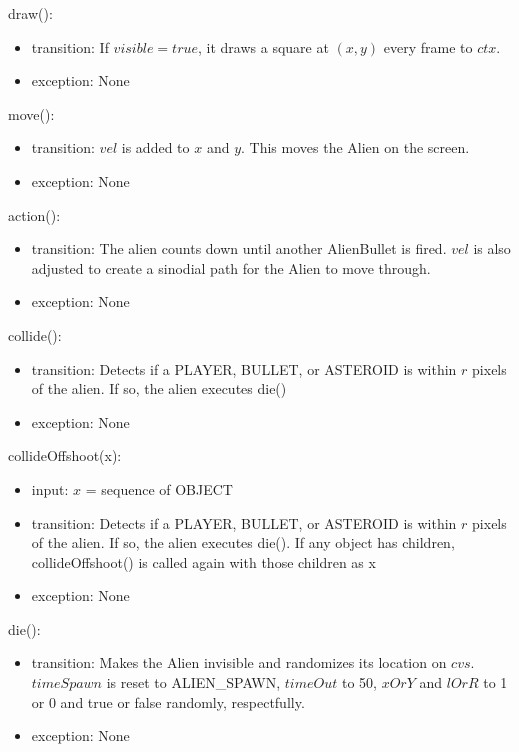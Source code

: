 \documentclass[12pt]{article}
\begin{document}
draw():
\begin{itemize}
  \item transition: If $visible = true$, it draws a square at $(x,y)$ every frame to $ctx$.
  \item exception: None
\end{itemize}

move():
\begin{itemize}
  \item transition: $vel$ is added to $x$ and $y$. This moves the Alien on the screen.
  \item exception: None
\end{itemize}

action():
\begin{itemize}
  \item transition: The alien counts down until another AlienBullet is fired. $vel$ is also adjusted to create a sinodial path for the Alien to move through.
  \item exception: None
\end{itemize}

collide():
\begin{itemize}
  \item transition: Detects if a PLAYER, BULLET, or ASTEROID is within $r$ pixels of the alien. If so, the alien executes die()
  \item exception: None
\end{itemize}

collideOffshoot(x):
\begin{itemize}
  \item input: $x$ = sequence of OBJECT
  \item transition: Detects if a PLAYER, BULLET, or ASTEROID is within $r$ pixels of the alien. If so, the alien executes die(). If any object has children, collideOffshoot() is called again with those children as x
  \item exception: None
\end{itemize}

die():
\begin{itemize}
  \item transition: Makes the Alien invisible and randomizes its location on $cvs$. $timeSpawn$ is reset to ALIEN\_SPAWN, $timeOut$ to 50, $xOrY$ and $lOrR$ to 1 or 0 and true or false randomly, respectfully.
  \item exception: None
\end{itemize}

\newpage
\end{document}
